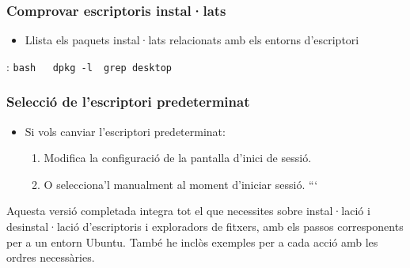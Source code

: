 \documentclass[
  a4paper,
]{article}
\providecommand{\tightlist}{%
  \setlength{\itemsep}{0pt}\setlength{\parskip}{0pt}}
\begin{document}
\subsubsection{Comprovar escriptoris
instal·lats}\label{comprovar-escriptoris-installats}

\begin{itemize}
\tightlist
\item
  Llista els paquets instal·lats relacionats amb els entorns
  d'escriptori
\end{itemize}

: \texttt{bash\ \ \ dpkg\ -l\ \textbar{}\ grep\ desktop}

\subsubsection{Selecció de l'escriptori
predeterminat}\label{selecciuxf3-de-lescriptori-predeterminat}

\begin{itemize}
\tightlist
\item
  Si vols canviar l'escriptori predeterminat:

  \begin{enumerate}
  \def\labelenumi{\arabic{enumi}.}
  \tightlist
  \item
    Modifica la configuració de la pantalla d'inici de sessió.
  \item
    O selecciona'l manualment al moment d'iniciar sessió. ```
  \end{enumerate}
\end{itemize}

Aquesta versió completada integra tot el que necessites sobre
instal·lació i desinstal·lació d'escriptoris i exploradors de fitxers,
amb els passos corresponents per a un entorn Ubuntu. També he inclòs
exemples per a cada acció amb les ordres necessàries.
\end{document}

